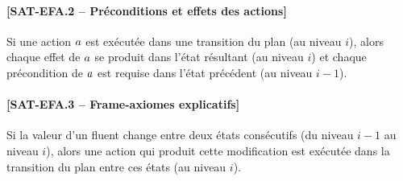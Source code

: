 \paragraph*{[SAT-EFA.2 -- Préconditions et effets des actions]} %
Si une action $a$ est exécutée dans une transition du plan (au niveau $i$), alors chaque effet de $a$ se produit dans l'état résultant (au niveau $i$) et chaque précondition de $a$ est requise dans l'état précédent (au niveau $i-1$).
\paragraph*{[SAT-EFA.3 -- Frame-axiomes explicatifs]} %
Si la valeur d'un fluent change entre deux états consécutifs (du niveau $i-1$ au niveau $i$), alors une action qui produit cette modification est exécutée dans la transition du plan entre ces états (au niveau $i$).
